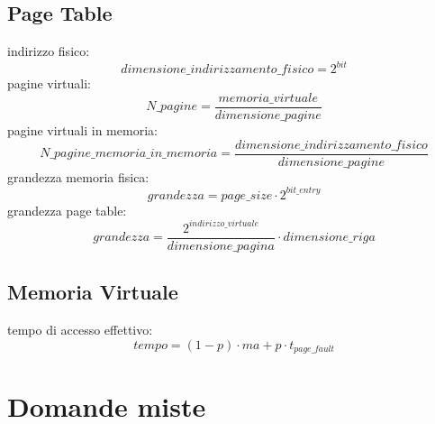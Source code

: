 \documentclass[a4paper,12pt, oneside]{book}
\begin{document}
\section{Page Table}
indirizzo fisico:
$$dimensione\_indirizzamento\_fisico=2^{bit}$$
pagine virtuali:
$$N\_pagine=\frac{memoria\_virtuale}{dimensione\_pagine}$$
pagine virtuali in memoria:
$$N\_pagine\_memoria\_in\_memoria=\frac{dimensione\_indirizzamento\_fisico}{dimensione\_pagine}$$
grandezza memoria fisica:
$$grandezza=page\_size\cdot 2^{bit\_entry}$$
grandezza page table:
$$grandezza=\frac{2^{indirizzo\_virtuale}}{dimensione\_pagina}\cdot dimensione\_riga$$
\section{Memoria Virtuale}
tempo di accesso effettivo:
$$tempo=(1-p)\cdot ma+p\cdot t_{page\_fault}$$
\chapter{Domande miste}
\end{document}
